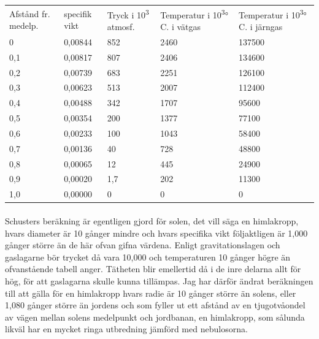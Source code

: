 \documentclass[a4paper, 12pt, oneside, swedish]{article}
\begin{document}
\begin{table}[H]
    \centering
    \footnotesize
    \Fontauri
    \begin{tabular}{p{15mm} p{15mm} p{15mm} p{21mm} p{23mm}}
        Afstånd fr. medelp. & specifik vikt & Tryck i 10\textsuperscript{3} atmosf. & Temperatur i 10\textsuperscript{3}° C. i vätgas & Temperatur i 10\textsuperscript{3}° C. i järngas \\
        0 & 0,00844 & 852 & 2460 & 137500 \\
        0,1 & 0,00817 & 807 & 2406 & 134600 \\
        0,2 & 0,00739 & 683 & 2251 & 126100 \\ 
        0,3 & 0,00623 & 513 & 2007 & 112400 \\
        0,4 & 0,00488 & 342 & 1707 & 95600 \\
        0,5 & 0,00354 & 200 & 1377 & 77100 \\
        0,6 & 0,00233 & 100 & 1043 & 58400 \\
        0,7 & 0,00136 & 40 & 728 & 48800 \\
        0,8 & 0,00065 & 12 & 445 & 24900 \\
        0,9 & 0,00020 & 1,7 & 202 & 11300 \\
        1,0 & 0,00000 & 0 & 0 & 0 \\
    \end{tabular}
\end{table}
\paragraph{}
Schusters beräkning är egentligen gjord för solen, det vill säga en himlakropp, hvars diameter är 10 gånger mindre och hvars specifika vikt följaktligen är 1,000 gånger större än de här ofvan gifna värdena. Enligt gravitationslagen och gaslagarne bör trycket då vara 10,000 och temperaturen 10 gånger högre än ofvanstående tabell anger. Tätheten blir emellertid då i de inre delarna allt för hög, för att gaslagarna skulle kunna tillämpas. Jag har därför ändrat beräkningen till att gälla för en himlakropp hvars radie är 10 gånger större än solens, eller 1,080 gånger större än jordens och som fyller ut ett afstånd av en tjugotvåondel av vägen mellan solens medelpunkt och jordbanan, en himlakropp, som sålunda likväl har en mycket ringa utbredning jämförd med nebulosorna.
\end{document}
